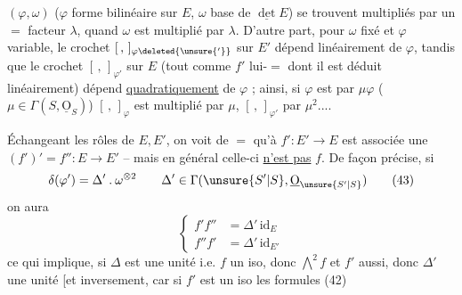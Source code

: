 $(\varphi,\omega)$ ($\varphi$ forme bilinéaire sur $E$, $\omega$ base de $\underline{\det} E$) se trouvent multipliés par un $=$ facteur $\lambda$, quand $\omega$ est multiplié par $\lambda$. D'autre part, pour $\omega$ fixé et $\varphi$ variable, le crochet $[\, ,\,]_{\varphi\deleted{\unsure{'}}}$ sur $E'$ dépend linéairement de $\varphi$, tandis que le crochet $[\, ,\,]_{\varphi'}$ sur $E$ (tout comme $f'$ lui-$=$ dont il est déduit linéairement) dépend \uline{quadratiquement} de $\varphi$ ; ainsi, si $\varphi$ est  par $\mu\varphi$ ($\mu\in\Gamma(S,\underline{\mathrm O}_S)$) $[\, ,\,]_\varphi$ est multiplié par $\mu$, $[\, ,\,]_{\varphi'}$ par $\mu^2$....

Échangeant les rôles de $E,E'$, on voit de $=$ qu'à $f':E'\to E$ est associée une $(f')'=f'':E\to E'$ -- mais en général celle-ci \uline{n'est pas} $f$. De façon précise, si 
\[
 \delta(\varphi')=\Delta'\mathbin{.}\omega^{\otimes2}\qquad
 \Delta'\in\Gamma(\unsure{S'|S},\underline{\mathrm O}_{\unsure{S'|S}}) \tag*{(43)}
\]
on aura
\[
 \left\{\begin{aligned}
 f'f''&=\Delta'\,\mathrm{id}_E\\
 f''f'&=\Delta'\,\mathrm{id}_{E'}
 \end{aligned}\right. \tag*{(44)}
\]
ce qui  implique, si $\Delta$ est une unité i.e. $f$ un iso, donc $\bigwedge^2f$ et $f'$ aussi, donc $\Delta'$ une unité [et inversement, car si $f'$ est un iso les formules (42)

